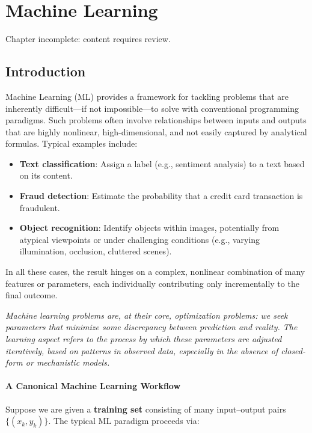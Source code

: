 \chapter{Machine Learning}

\begin{warningblock}
Chapter incomplete: content requires review.
\end{warningblock}

\section{Introduction}

Machine Learning (ML) provides a framework for tackling problems that are inherently difficult—if not impossible—to solve with conventional programming paradigms. Such problems often involve relationships between inputs and outputs that are highly nonlinear, high-dimensional, and not easily captured by analytical formulas. Typical examples include:

\begin{itemize}
    \item \textbf{Text classification}: Assign a label (e.g., sentiment analysis) to a text based on its content.
    \item \textbf{Fraud detection}: Estimate the probability that a credit card transaction is fraudulent.
    \item \textbf{Object recognition}: Identify objects within images, potentially from atypical viewpoints or under challenging conditions (e.g., varying illumination, occlusion, cluttered scenes).
\end{itemize}

In all these cases, the result hinges on a complex, nonlinear combination of many features or parameters, each individually contributing only incrementally to the final outcome.

\begin{observationblock}
    \textit{Machine learning problems are, at their core, optimization problems: we seek parameters that minimize some discrepancy between prediction and reality. The learning aspect refers to the process by which these parameters are adjusted iteratively, based on patterns in observed data, especially in the absence of closed-form or mechanistic models.}
\end{observationblock}

\subsubsection*{A Canonical Machine Learning Workflow}
Suppose we are given a \textbf{training set} consisting of many input--output pairs $\{(x_k, y_k)\}$. The typical ML paradigm proceeds via:

